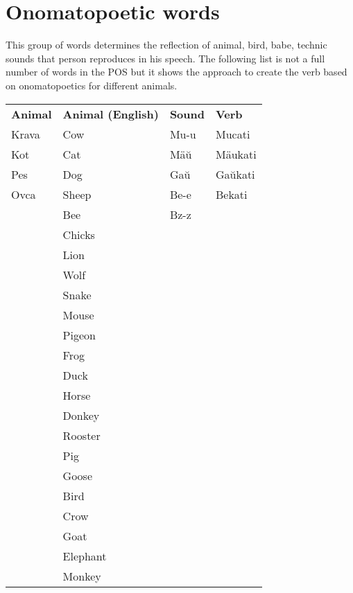 \section{Onomatopoetic words}

This group of words determines the reflection of animal, bird, babe, technic sounds that person reproduces in his speech. The following list is not a full number of words in the POS but it shows the approach to create the verb based on onomatopoetics for different animals.

\begin{table}
	\begin{tabular}{llll}
		\textbf{Animal} & \textbf{Animal (English)} & \textbf{Sound} & \textbf{Verb} \\
		Krava & Cow & Mu-u & Mucati \\
		Kot & Cat & Mäŭ & Mäukati \\
		Pes & Dog & Gaŭ & Gaŭkati \\
		Ovca & Sheep & Be-e & Bekati \\
		& Bee & Bz-z & \\
		& Chicks && \\
		& Lion && \\
		& Wolf && \\
		& Snake && \\
		& Mouse && \\
		& Pigeon && \\
		& Frog && \\
		& Duck && \\
		& Horse && \\
		& Donkey && \\
		& Rooster && \\
		& Pig && \\
		& Goose && \\
		& Bird && \\
		& Crow && \\
		& Goat&& \\
		& Elephant&&\\
		& Monkey&&\\
	\end{tabular}
\end{table}

